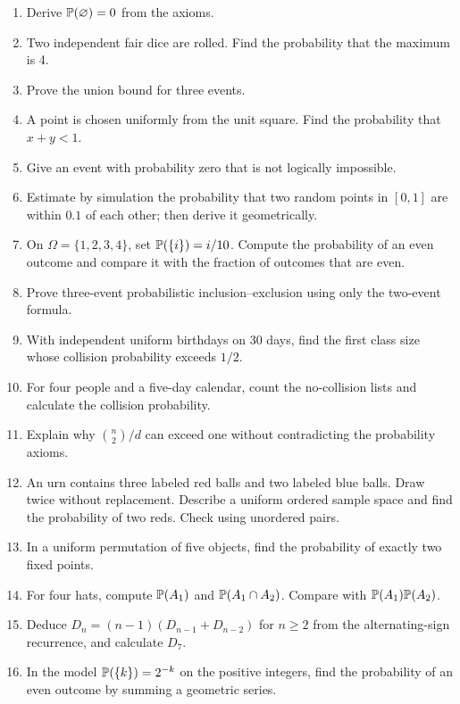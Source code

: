 \begin{exercisebox}
\begin{enumerate}
  \item Derive $\P(\varnothing)=0$ from the axioms. 
  \item Two independent fair dice are rolled. Find the probability that the maximum is 4. 
  \item Prove the union bound for three events. 
  \item A point is chosen uniformly from the unit square. Find the probability that $x+y<1$. 
  \item Give an event with probability zero that is not logically impossible. 
  \item Estimate by simulation the probability that two random points in $[0,1]$ are within $0.1$ of each other; then derive it geometrically. 
  \item On $\Omega=\{1,2,3,4\}$, set $\P(\{i\})=i/10$. Compute the probability of an even outcome and compare it with the fraction of outcomes that are even. 
  \item Prove three-event probabilistic inclusion--exclusion using only the two-event formula. 
  \item With independent uniform birthdays on 30 days, find the first class size whose collision probability exceeds $1/2$. 
  \item For four people and a five-day calendar, count the no-collision lists and calculate the collision probability. 
  \item Explain why $\binom n2/d$ can exceed one without contradicting the probability axioms. 
  \item An urn contains three labeled red balls and two labeled blue
  balls. Draw twice without replacement. Describe a uniform ordered
  sample space and find the probability of two reds. Check using
  unordered pairs. 
  \item In a uniform permutation of five objects, find the probability
  of exactly two fixed points. 
  \item For four hats, compute $\P(A_1)$ and $\P(A_1\cap A_2)$.
  Compare with $\P(A_1)\P(A_2)$. 
  \item Deduce $D_n=(n-1)(D_{n-1}+D_{n-2})$ for $n\ge2$ from
  the alternating-sign recurrence, and calculate $D_7$. 
  \item In the model $\P(\{k\})=2^{-k}$ on the positive integers,
  find the probability of an even outcome by summing a geometric series.
\end{enumerate}
\end{exercisebox}
